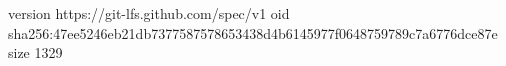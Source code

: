 version https://git-lfs.github.com/spec/v1
oid sha256:47ee5246eb21db7377587578653438d4b6145977f0648759789c7a6776dce87e
size 1329
